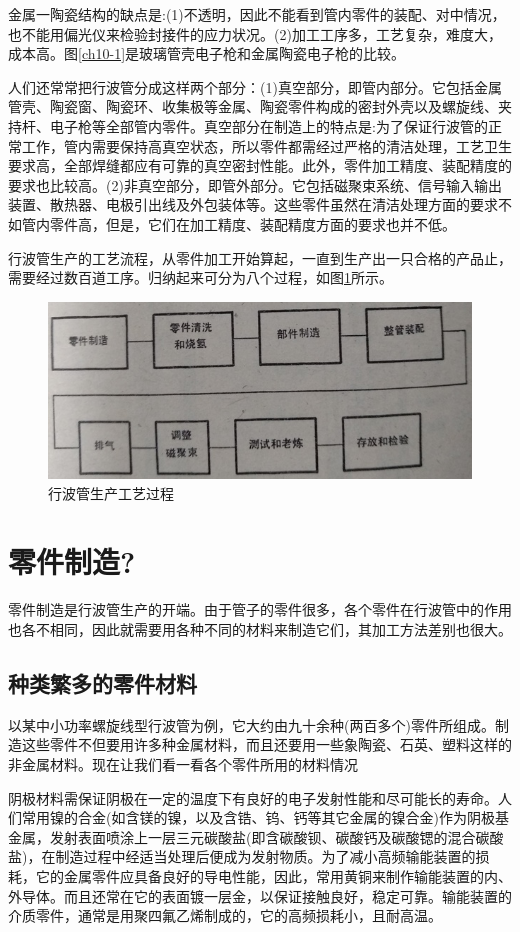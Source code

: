 金属一陶瓷结构的缺点是:(1)不透明，因此不能看到管内零件的装配、对中情况，也不能用偏光仪来检验封接件的应力状况。(2)加工工序多，工艺复杂，难度大，成本高。图\ref{ch10-1}是玻璃管壳电子枪和金属陶瓷电子枪的比较。


人们还常常把行波管分成这样两个部分：(1)真空部分，即管内部分。它包括金属管壳、陶瓷窗、陶瓷环、收集极等金属、陶瓷零件构成的密封外壳以及螺旋线、夹持杆、电子枪等全部管内零件。真空部分在制造上的特点是:为了保证行波管的正常工作，管内需要保持高真空状态，所以零件都需经过严格的清洁处理，工艺卫生要求高，全部焊缝都应有可靠的真空密封性能。此外，零件加工精度、装配精度的要求也比较高。(2)非真空部分，即管外部分。它包括磁聚束系统、信号输入输出装置、散热器、电极引出线及外包装体等。这些零件虽然在清洁处理方面的要求不如管内零件高，但是，它们在加工精度、装配精度方面的要求也并不低。


行波管生产的工艺流程，从零件加工开始算起，一直到生产出一只合格的产品止，需要经过数百道工序。归纳起来可分为八个过程，如图\ref{ch10-2}所示。



\begin{figure}[phtb]
	\centering
	\includegraphics[width=0.75\linewidth]{figure/ch10-2}
	\caption{ 行波管生产工艺过程}
	\label{ch10-2}
\end{figure}

\section{零件制造?}
零件制造是行波管生产的开端。由于管子的零件很多，各个零件在行波管中的作用也各不相同，因此就需要用各种不同的材料来制造它们，其加工方法差别也很大。
\subsection{种类繁多的零件材料}
以某中小功率螺旋线型行波管为例，它大约由九十余种(两百多个)零件所组成。制造这些零件不但要用许多种金属材料，而且还要用一些象陶瓷、石英、塑料这样的非金属材料。现在让我们看一看各个零件所用的材料情况


阴极材料需保证阴极在一定的温度下有良好的电子发射性能和尽可能长的寿命。人们常用镍的合金(如含镁的镍，以及含锆、钨、钙等其它金属的镍合金)作为阴极基金属，发射表面喷涂上一层三元碳酸盐(即含碳酸钡、碳酸钙及碳酸锶的混合碳酸盐)，在制造过程中经适当处理后便成为发射物质。为了减小高频输能装置的损耗，它的金属零件应具备良好的导电性能，因此，常用黄铜来制作输能装置的内、外导体。而且还常在它的表面镀一层金，以保证接触良好，稳定可靠。输能装置的介质零件，通常是用聚四氟乙烯制成的，它的高频损耗小，且耐高温。



